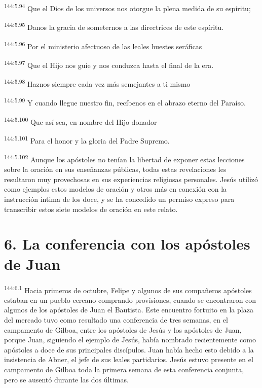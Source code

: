 \begin{center}
\par
\textsuperscript{144:5.94} Que el Dios de los universos nos otorgue la plena medida de su espíritu;

\par
\textsuperscript{144:5.95} Danos la gracia de someternos a las directrices de este espíritu.

\par
\textsuperscript{144:5.96} Por el ministerio afectuoso de las leales huestes seráficas

\par
\textsuperscript{144:5.97} Que el Hijo nos guíe y nos conduzca hasta el final de la era.

\par
\textsuperscript{144:5.98} Haznos siempre cada vez más semejantes a ti mismo

\par
\textsuperscript{144:5.99} Y cuando llegue nuestro fin, recíbenos en el abrazo eterno del Paraíso.

\par
\textsuperscript{144:5.100} Que así sea, en nombre del Hijo donador

\par
\textsuperscript{144:5.101} Para el honor y la gloria del Padre Supremo.
\end{center}

\par
\textsuperscript{144:5.102} Aunque los apóstoles no tenían la libertad de exponer estas lecciones sobre la oración en sus enseñanzas públicas, todas estas revelaciones les resultaron muy provechosas en sus experiencias religiosas personales. Jesús utilizó como ejemplos estos modelos de oración y otros más en conexión con la instrucción íntima de los doce, y se ha concedido un permiso expreso para transcribir estos siete modelos de oración en este relato.

\section*{6. La conferencia con los apóstoles de Juan}
\par
\textsuperscript{144:6.1} Hacia primeros de octubre, Felipe y algunos de sus compañeros apóstoles estaban en un pueblo cercano comprando provisiones, cuando se encontraron con algunos de los apóstoles de Juan el Bautista. Este encuentro fortuito en la plaza del mercado tuvo como resultado una conferencia de tres semanas, en el campamento de Gilboa, entre los apóstoles de Jesús y los apóstoles de Juan, porque Juan, siguiendo el ejemplo de Jesús, había nombrado recientemente como apóstoles a doce de sus principales discípulos. Juan había hecho esto debido a la insistencia de Abner, el jefe de sus leales partidarios. Jesús estuvo presente en el campamento de Gilboa toda la primera semana de esta conferencia conjunta, pero se ausentó durante las dos últimas.

